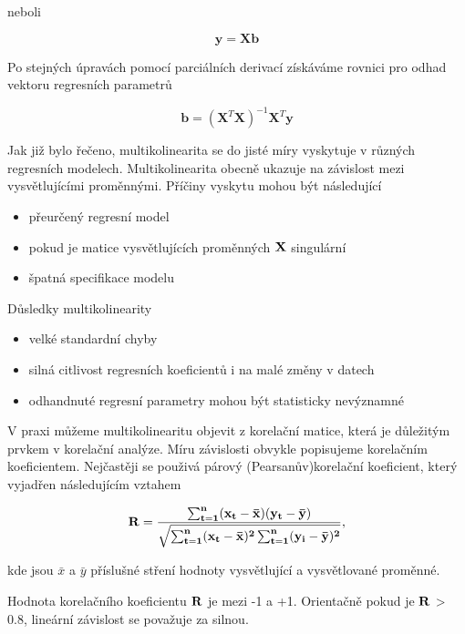 \documentclass[a4paper,12pt,twoside]{scrreprt}
\begin{document}
neboli 

\begin{equation}
\mathbf{y} = \mathbf{Xb}
\end{equation}

Po stejných úpravách pomocí parciálních derivací získáváme rovnici pro odhad vektoru regresních parametrů

\begin{equation}
\mathbf{b} = (\mathbf{X}^T\mathbf{X})^{-1}\mathbf{X}^T\mathbf{y}
\end{equation}

Jak již bylo řečeno, multikolinearita se do jisté míry vyskytuje v různých regresních modelech. Multikolinearita obecně ukazuje na závislost mezi vysvětlujícími proměnnými. Příčiny vyskytu mohou být následující

\begin{itemize}
\item přeurčený regresní model
\item pokud je matice vysvětlujících proměnných $\bf{X}$ singulární
\item špatná specifikace modelu
\end{itemize}

Důsledky multikolinearity

\begin{itemize}
\item velké standardní chyby
\item silná citlivost regresních koeficientů i na malé změny v datech
\item odhandnuté regresní parametry mohou být statisticky nevýznamné
\end{itemize}

V praxi můžeme multikolinearitu objevit z korelační matice, která je důležitým prvkem v korelační analýze. Míru závislosti obvykle popisujeme korelačním koeficientem. Nejčastěji se použivá párový (Pearsanův)korelační koeficient, který vyjadřen následujícím vztahem

\begin{equation}
\bf{R} = \frac{\sum_{t=1}^{n}(x_t - \bar{x})(y_t - \bar{y})}{\sqrt{\sum_{t=1}^{n}(x_t - \bar{x})^2\sum_{t=1}^{n}(y_i - \bar{y})^2}},
\end{equation}

kde jsou $\bar{x}$ a $\bar{y}$ příslušné stření hodnoty vysvětlující a vysvětlované proměnné. 

Hodnota korelačního koeficientu $\bf{R}$ je mezi -1 a +1. Orientačně pokud je $\bf{R}$ > 0.8, lineární závislost se považuje za silnou. 
\end{document}

